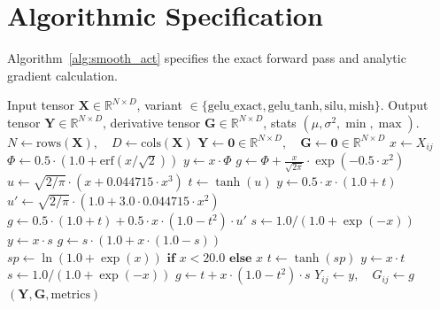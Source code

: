 \documentclass[11pt]{article}
\begin{document}
\section{Algorithmic Specification}
\label{sec:algorithm}

Algorithm~\ref{alg:smooth_act} specifies the exact forward pass and analytic gradient calculation.

\begin{algorithm}[H]
\caption{Deterministic Smooth Non-Monotonic Activation and Gradient Evaluation}
\label{alg:smooth_act}
\begin{algorithmic}[1]
\Require Input tensor $\mathbf{X} \in \mathbb{R}^{N \times D}$, variant $\in \{\text{gelu\_exact}, \text{gelu\_tanh}, \text{silu}, \text{mish}\}$.
\Ensure Output tensor $\mathbf{Y} \in \mathbb{R}^{N \times D}$, derivative tensor $\mathbf{G} \in \mathbb{R}^{N \times D}$, stats $(\mu, \sigma^2, \min, \max)$.
\State $N \gets \text{rows}(\mathbf{X}), \quad D \gets \text{cols}(\mathbf{X})$
\State $\mathbf{Y} \gets \mathbf{0} \in \mathbb{R}^{N \times D}, \quad \mathbf{G} \gets \mathbf{0} \in \mathbb{R}^{N \times D}$
        \State $x \gets X_{ij}$
            \State $\Phi \gets 0.5 \cdot (1.0 + \text{erf}(x / \sqrt{2}))$
            \State $y \gets x \cdot \Phi$
            \State $g \gets \Phi + \frac{x}{\sqrt{2\pi}} \cdot \exp(-0.5 \cdot x^2)$
            \State $u \gets \sqrt{2/\pi} \cdot (x + 0.044715 \cdot x^3)$
            \State $t \gets \tanh(u)$
            \State $y \gets 0.5 \cdot x \cdot (1.0 + t)$
            \State $u' \gets \sqrt{2/\pi} \cdot (1.0 + 3.0 \cdot 0.044715 \cdot x^2)$
            \State $g \gets 0.5 \cdot (1.0 + t) + 0.5 \cdot x \cdot (1.0 - t^2) \cdot u'$
            \State $s \gets 1.0 / (1.0 + \exp(-x))$
            \State $y \gets x \cdot s$
            \State $g \gets s \cdot (1.0 + x \cdot (1.0 - s))$
            \State $sp \gets \ln(1.0 + \exp(x)) \textbf{ if } x < 20.0 \textbf{ else } x$
            \State $t \gets \tanh(sp)$
            \State $y \gets x \cdot t$
            \State $s \gets 1.0 / (1.0 + \exp(-x))$
            \State $g \gets t + x \cdot (1.0 - t^2) \cdot s$
        \EndIf
        \State $Y_{ij} \gets y, \quad G_{ij} \gets g$
    \EndFor
\EndFor
\State \Return $(\mathbf{Y}, \mathbf{G}, \text{metrics})$
\end{algorithmic}
\end{algorithm}
\end{document}
